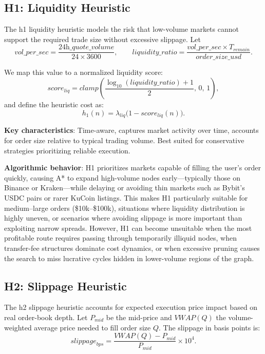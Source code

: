 \documentclass[11pt]{article}
\begin{document}
\subsection{H1: Liquidity Heuristic}

The h1 liquidity heuristic models the risk that low-volume markets cannot support the required trade size without excessive slippage. Let
\[
\textit{vol\_per\_sec} = \frac{\textit{24h\_quote\_volume}}{24 \times 3600},
\qquad
\textit{liquidity\_ratio} =
\frac{\textit{vol\_per\_sec} \times T_{\textit{remain}}}{\textit{order\_size\_usd}}.
\]

We map this value to a normalized liquidity score:
\[
\textit{score}_{liq} =
\textit{clamp}\!\left(\frac{\log_{10}(\textit{liquidity\_ratio})+1}{2},\,0,\,1\right),
\]
and define the heuristic cost as:
\[
h_1(n) = \lambda_{liq}\big(1-\textit{score}_{liq}(n)\big).
\]

\textbf{Key characteristics}: Time-aware, captures market activity over time, accounts for order size relative to typical trading volume. Best suited for conservative strategies prioritizing reliable execution.

\textbf{Algorithmic behavior}: H1 prioritizes markets capable of filling the user's order quickly, causing A* to expand high-volume nodes early---typically those on Binance or Kraken---while delaying or avoiding thin markets such as Bybit's USDC pairs or rarer KuCoin listings. This makes H1 particularly suitable for medium--large orders (\$10k--\$100k), situations where liquidity distribution is highly uneven, or scenarios where avoiding slippage is more important than exploiting narrow spreads. However, H1 can become unsuitable when the most profitable route requires passing through temporarily illiquid nodes, when transfer-fee structures dominate cost dynamics, or when excessive pruning causes the search to miss lucrative cycles hidden in lower-volume regions of the graph.

\subsection{H2: Slippage Heuristic}

The h2 slippage heuristic accounts for expected execution price impact based on real order-book depth. Let $P_{mid}$ be the mid-price and $\textit{VWAP}(Q)$ the volume-weighted average price needed to fill order size $Q$. The slippage in basis points is:
\[
\textit{slippage}_{bps} =
\frac{\textit{VWAP}(Q) - P_{mid}}{P_{mid}} \times 10^{4}.
\]
\end{document}
